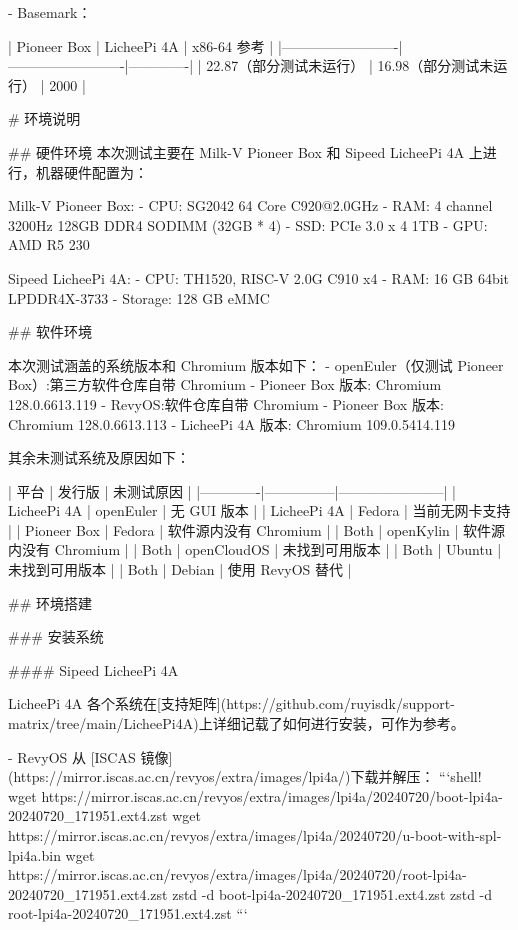 \documentclass{article}
\begin{document}
\begin{markdown}
- Basemark：

| Pioneer Box             | LicheePi 4A             | x86-64 参考 |
|-------------------------|-------------------------|-------------|
| 22.87（部分测试未运行） | 16.98（部分测试未运行） | 2000        |

# 环境说明

## 硬件环境
本次测试主要在 Milk-V Pioneer Box 和 Sipeed LicheePi 4A 上进行，机器硬件配置为：

Milk-V Pioneer Box:
- CPU: SG2042 64 Core C920@2.0GHz
- RAM: 4 channel 3200Hz 128GB DDR4 SODIMM (32GB * 4)
- SSD: PCIe 3.0 x 4 1TB
- GPU: AMD R5 230

Sipeed LicheePi 4A:
- CPU: TH1520, RISC-V 2.0G C910 x4
- RAM: 16 GB 64bit LPDDR4X-3733
- Storage: 128 GB eMMC

## 软件环境

本次测试涵盖的系统版本和 Chromium 版本如下：
- openEuler（仅测试 Pioneer Box）:第三方软件仓库自带 Chromium 
  - Pioneer Box 版本: Chromium 128.0.6613.119
- RevyOS:软件仓库自带 Chromium
  - Pioneer Box 版本: Chromium 128.0.6613.113
  - LicheePi 4A 版本: Chromium 109.0.5414.119
  
其余未测试系统及原因如下：

| 平台        | 发行版        | 未测试原因              |
|-------------|---------------|-----------------------|
| LicheePi 4A | openEuler     | 无 GUI 版本           |
| LicheePi 4A | Fedora        | 当前无网卡支持        |
| Pioneer Box | Fedora        | 软件源内没有 Chromium |
| Both        | openKylin     | 软件源内没有 Chromium |
| Both        | openCloudOS   | 未找到可用版本        |
| Both        | Ubuntu        | 未找到可用版本        |
| Both        | Debian | 使用 RevyOS 替代      |

## 环境搭建

### 安装系统

#### Sipeed LicheePi 4A

LicheePi 4A 各个系统在[支持矩阵](https://github.com/ruyisdk/support-matrix/tree/main/LicheePi4A)上详细记载了如何进行安装，可作为参考。

- RevyOS
从 [ISCAS 镜像](https://mirror.iscas.ac.cn/revyos/extra/images/lpi4a/)下载并解压：
```shell!
wget https://mirror.iscas.ac.cn/revyos/extra/images/lpi4a/20240720/boot-lpi4a-20240720_171951.ext4.zst
wget https://mirror.iscas.ac.cn/revyos/extra/images/lpi4a/20240720/u-boot-with-spl-lpi4a.bin
wget https://mirror.iscas.ac.cn/revyos/extra/images/lpi4a/20240720/root-lpi4a-20240720_171951.ext4.zst
zstd -d boot-lpi4a-20240720_171951.ext4.zst
zstd -d root-lpi4a-20240720_171951.ext4.zst
```


\end{markdown}
\end{document}
